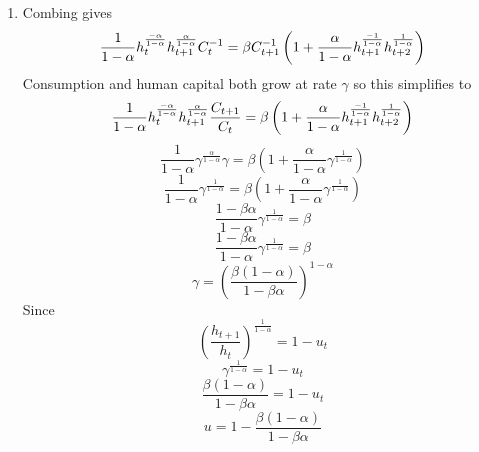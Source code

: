 \documentclass{article}
\begin{document}
\begin{enumerate}
\item Combing gives 
\begin{equation*}
\frac{1}{1-\alpha }h_{t}^{\frac{-\alpha }{1-\alpha }}h_{t+1}^{\frac{\alpha }{%
1-\alpha }}C_{t}^{-1}=\beta C_{t+1}^{-1}\left( 1+\frac{\alpha }{1-\alpha }%
h_{t+1}^{\frac{-1}{1-\alpha }}h_{t+2}^{\frac{1}{1-\alpha }}\right)
\end{equation*}%
Consumption and human capital both grow at rate $\gamma $ so this simplifies
to%
\begin{equation*}
\frac{1}{1-\alpha }h_{t}^{\frac{-\alpha }{1-\alpha }}h_{t+1}^{\frac{\alpha }{%
1-\alpha }}\frac{C_{t+1}}{C_{t}}=\beta \left( 1+\frac{\alpha }{1-\alpha }%
h_{t+1}^{\frac{-1}{1-\alpha }}h_{t+2}^{\frac{1}{1-\alpha }}\right)
\end{equation*}%
\begin{equation*}
\frac{1}{1-\alpha }\gamma ^{\frac{\alpha }{1-\alpha }}\gamma =\beta \left( 1+%
\frac{\alpha }{1-\alpha }\gamma ^{\frac{1}{1-\alpha }}\right)
\end{equation*}%
\begin{equation*}
\frac{1}{1-\alpha }\gamma ^{\frac{1}{1-\alpha }}=\beta \left( 1+\frac{\alpha 
}{1-\alpha }\gamma ^{\frac{1}{1-\alpha }}\right)
\end{equation*}%
\begin{equation*}
\frac{1-\beta \alpha }{1-\alpha }\gamma ^{\frac{1}{1-\alpha }}=\beta
\end{equation*}%
\begin{equation*}
\frac{1-\beta \alpha }{1-\alpha }\gamma ^{\frac{1}{1-\alpha }}=\beta
\end{equation*}%
\begin{equation*}
\gamma =\left( \frac{\beta \left( 1-\alpha \right) }{1-\beta \alpha }\right)
^{1-\alpha }
\end{equation*}%
Since 
\begin{equation*}
\left( \frac{h_{t+1}}{h_{t}}\right) ^{\frac{1}{1-\alpha }}=1-u_{t}
\end{equation*}%
\begin{equation*}
\gamma ^{\frac{1}{1-\alpha }}=1-u_{t}
\end{equation*}%
\begin{equation*}
\frac{\beta \left( 1-\alpha \right) }{1-\beta \alpha }=1-u_{t}
\end{equation*}%
\begin{equation*}
u=1-\frac{\beta \left( 1-\alpha \right) }{1-\beta \alpha }
\end{equation*}
\end{enumerate}
\end{document}
